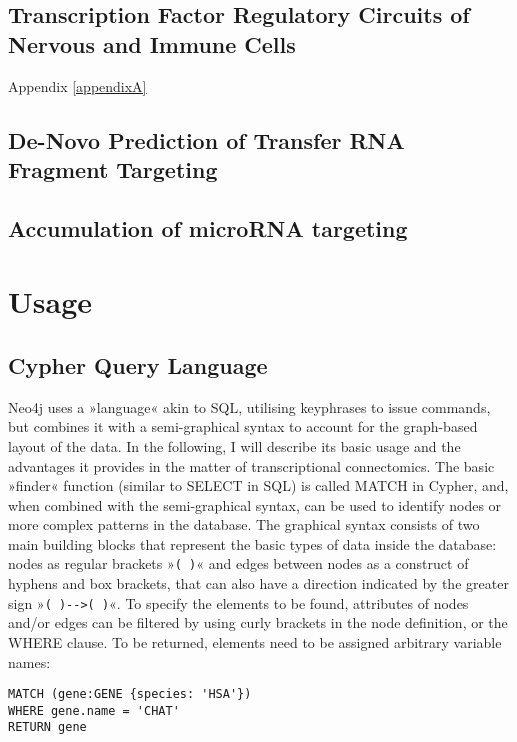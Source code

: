 \subsection{Transcription Factor Regulatory Circuits of Nervous and Immune Cells}
Appendix \ref{appendixA}

\subsection{De-Novo Prediction of Transfer RNA Fragment Targeting}

\subsection{Accumulation of microRNA targeting}

\section{Usage}
\subsection{Cypher Query Language}
Neo4j uses a »language« akin to SQL, utilising keyphrases to issue commands, but combines it with a semi-graphical syntax to account for the graph-based layout of the data. In the following, I will describe its basic usage and the advantages it provides in the matter of transcriptional connectomics. The basic »finder« function (similar to \textcolor{dkblue}{SELECT} in SQL) is called \textcolor{dkblue}{MATCH} in Cypher, and, when combined with the semi-graphical syntax, can be used to identify nodes or more complex patterns in the database. The graphical syntax consists of two main building blocks that represent the basic types of data inside the database: nodes as regular brackets »\texttt{( )}« and edges between nodes as  a construct of hyphens and box brackets, that can also have a direction indicated by the greater sign \mbox{»\texttt{( )-\string[ \string]->( )}«}. To specify the elements to be found, attributes of nodes and/or edges can be filtered by using curly brackets in the node definition, or the \textcolor{dkblue}{WHERE} clause. To be returned, elements need to be assigned arbitrary variable names:

\begin{lstlisting}[label=lst:match,caption=MATCH,
language=Cypher]
MATCH (gene:GENE {species: 'HSA'})
WHERE gene.name = 'CHAT'
RETURN gene
\end{lstlisting}

